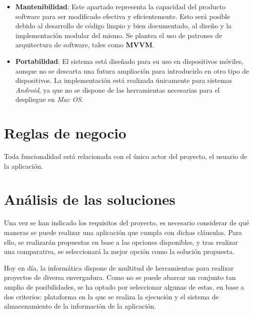 \begin{itemize}
    \item \textbf{Mantenibilidad}: Este apartado representa la capacidad del producto software para 
    ser modificado efectiva y eficientemente. Esto será posible debido al desarrollo de código 
    limpio y bien documentado, al diseño y la implementación modular del mismo. Se plantea el uso 
    de patrones de arquitectura de software, tales como \textbf{MVVM}.

    \item \textbf{Portabilidad}: El sistema está diseñado para su uso en dispositivos móviles, 
    aunque no se descarta una futura ampliación para introducirlo en otro tipo de dispositivos.
    La implementación está realizada únicamente para sistemas \textit{Android}, ya que no 
    se dispone de las herramientas necesarias para el despliegue en \textit{Mac OS}. 

\end{itemize}

\section{Reglas de negocio}
Toda funcionalidad está relacionada con el único actor del proyecto, el usuario de la aplicación.

\section{Análisis de las soluciones}
Una vez se han indicado los requisitos del proyecto, es necesario considerar de qué maneras se puede 
realizar una aplicación que cumpla con dichas cláusulas. Para ello, se realizarán propuestas en base a 
las opciones disponibles, y tras realizar una comparativa, se seleccionará la mejor opción como la 
solución propuesta. \medskip

Hoy en día, la informática dispone de multitud de herramientas para realizar proyectos de diversa envergadura.
Como no se puede abarcar un conjunto tan amplio de posibilidades, se ha optado por seleccionar algunas de estas, 
en base a dos criterios: plataforma en la que se realiza la ejecución y el sistema de almacenamiento de la información 
de la aplicación. \medskip


